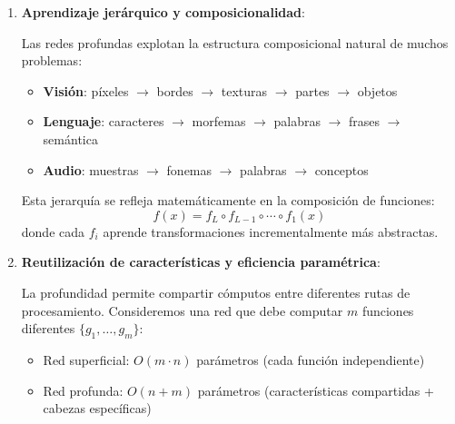 \begin{enumerate}
\begin{figure}[h]
	\caption[Profundidad vs anchura en redes neuronales]{Comparación entre red superficial ancha y red profunda estrecha para computar la misma función. La red superficial requiere exponencialmente más neuronas, mientras que la red profunda logra la misma expresividad con crecimiento polinomial.}
	\label{fig:profundidad_vs_anchura}
	\end{figure}

	\item \textbf{Aprendizaje jerárquico y composicionalidad}:

	Las redes profundas explotan la estructura composicional natural de muchos problemas:

	\begin{itemize}
		\item \textbf{Visión}: píxeles \(\to\) bordes \(\to\) texturas \(\to\) partes \(\to\) objetos
		\item \textbf{Lenguaje}: caracteres \(\to\) morfemas \(\to\) palabras \(\to\) frases \(\to\) semántica
		\item \textbf{Audio}: muestras \(\to\) fonemas \(\to\) palabras \(\to\) conceptos
	\end{itemize}

	Esta jerarquía se refleja matemáticamente en la composición de funciones:
	\[
		f(x) = f_L \circ f_{L-1} \circ \cdots \circ f_1(x)
	\]
	donde cada \(f_i\) aprende transformaciones incrementalmente más abstractas.

	\item \textbf{Reutilización de características y eficiencia paramétrica}:

	La profundidad permite compartir cómputos entre diferentes rutas de procesamiento. Consideremos una red que debe computar \(m\) funciones diferentes \(\{g_1, \ldots, g_m\}\):

	\begin{itemize}
		\item Red superficial: \(O(m \cdot n)\) parámetros (cada función independiente)
		\item Red profunda: \(O(n + m)\) parámetros (características compartidas + cabezas específicas)
	\end{itemize}


\end{enumerate}
